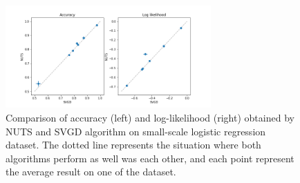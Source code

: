 \begin{figure}[h]
    \centering
    \includegraphics[width=0.7\textwidth]{figs/logistic_svgd_nuts.png}
    \caption{Comparison of accuracy (left) and log-likelihood (right) obtained by NUTS and SVGD algorithm on small-scale logistic regression dataset. The dotted line represents the situation where both algorithms perform as well was each other, and each point represent the average result on one of the dataset.}
    \label{fig:logist_small}
\end{figure}